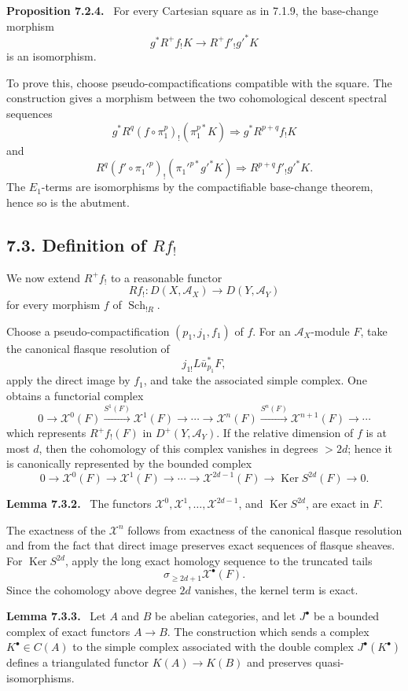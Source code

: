 \documentclass[12pt]{article}
\newcommand{\Aa}{\mathcal A}
\newcommand{\Xx}{\mathcal X}
\DeclareMathOperator{\Sch}{Sch}
\DeclareMathOperator{\Ker}{Ker}
\newenvironment{statement}[1]{\par\medskip\noindent\textbf{#1.}\ }{\par\medskip}
\begin{document}
\begin{statement}{Proposition 7.2.4}
For every Cartesian square as in 7.1.9, the base-change morphism
\[
g^*R^+f_!K\longrightarrow R^+f'_!g'^*K
\]
is an isomorphism.
\end{statement}

To prove this, choose pseudo-compactifications compatible with the square. The construction gives a morphism between the two cohomological descent spectral sequences
\[
g^*R^q(f\circ \pi^p_1)_!(\pi_1^{p*}K)
\Rightarrow g^*R^{p+q}f_!K
\]
and
\[
R^q(f'\circ \pi_1'^p)_!(\pi_1'^{p*}g'^*K)
\Rightarrow R^{p+q}f'_!g'^*K.
\]
The \(E_1\)-terms are isomorphisms by the compactifiable base-change theorem, hence so is the abutment.

\subsection*{7.3. Definition of \(Rf_!\)}

We now extend \(R^+f_!\) to a reasonable functor
\[
Rf_!:D(X,\Aa_X)\longrightarrow D(Y,\Aa_Y)
\]
for every morphism \(f\) of \(\Sch_{!R}\).

Choose a pseudo-compactification \((p_1,j_1,f_1)\) of \(f\). For an \(\Aa_X\)-module \(F\), take the canonical flasque resolution of
\[
j_{1!}L\bar u_{p_1}^*F,
\]
apply the direct image by \(f_1\), and take the associated simple complex. One obtains a functorial complex
\[
0\to\Xx^0(F)\xrightarrow{S^1(F)}\Xx^1(F)\to\cdots\to\Xx^n(F)\xrightarrow{S^n(F)}\Xx^{n+1}(F)\to\cdots
\]
which represents \(R^+f_!(F)\) in \(D^+(Y,\Aa_Y)\). If the relative dimension of \(f\) is at most \(d\), then the cohomology of this complex vanishes in degrees \(>2d\); hence it is canonically represented by the bounded complex
\[
0\to\Xx^0(F)\to\Xx^1(F)\to\cdots\to\Xx^{2d-1}(F)\to\Ker S^{2d}(F)\to0.
\]

\begin{statement}{Lemma 7.3.2}
The functors \(\Xx^0,\Xx^1,\ldots,\Xx^{2d-1}\), and \(\Ker S^{2d}\), are exact in \(F\).
\end{statement}

The exactness of the \(\Xx^n\) follows from exactness of the canonical flasque resolution and from the fact that direct image preserves exact sequences of flasque sheaves. For \(\Ker S^{2d}\), apply the long exact homology sequence to the truncated tails
\[
\sigma_{\ge2d+1}\Xx^\bullet(F).
\]
Since the cohomology above degree \(2d\) vanishes, the kernel term is exact.

\begin{statement}{Lemma 7.3.3}
Let \(A\) and \(B\) be abelian categories, and let \(J^\bullet\) be a bounded complex of exact functors \(A\to B\). The construction which sends a complex \(K^\bullet\in C(A)\) to the simple complex associated with the double complex \(J^\bullet(K^\bullet)\) defines a triangulated functor \(K(A)\to K(B)\) and preserves quasi-isomorphisms.
\end{statement}
\end{document}
